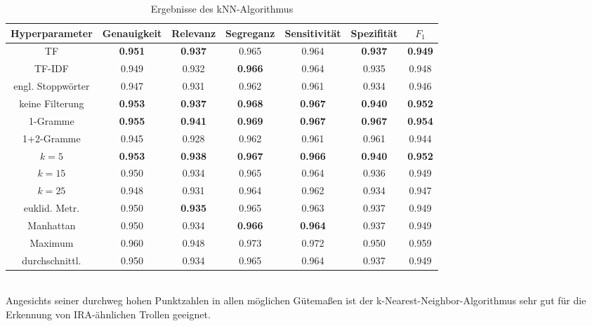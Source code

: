 \begin{table}[htb]
	\begin{center}
		\begin{tabular}{|c|c|c|c|c|c|c|}
			\hline 
			Hyperparameter & Genauigkeit & Relevanz & Segreganz & Sensitivität & Spezifität & $F_1$ \\ \hline \hline
			TF & \textbf{0.951} & \textbf{0.937} & 0.965 & 0.964 & \textbf{0.937} & \textbf{0.949} \\ \hline
			TF-IDF  & 0.949 & 0.932 & \textbf{0.966} & 0.964 & 0.935 & 0.948 \\ \hline \hline
			engl. Stoppwörter  & 0.947 & 0.931 & 0.962 & 0.961 & 0.934 & 0.946 \\ \hline
			keine Filterung  & \textbf{0.953} & \textbf{0.937} & \textbf{0.968} & \textbf{0.967} & \textbf{0.940} & \textbf{0.952} \\ \hline \hline
			1-Gramme  & \textbf{0.955} & \textbf{0.941} & \textbf{0.969} & \textbf{0.967} & \textbf{0.967} & \textbf{0.954} \\ \hline 
			1+2-Gramme  & 0.945 & 0.928 & 0.962 & 0.961 & 0.961 & 0.944 \\ \hline \hline
			$k = 5$  & \textbf{0.953} & \textbf{0.938} & \textbf{0.967} & \textbf{0.966} & \textbf{0.940} & \textbf{0.952} \\ \hline 
			$k = 15$  & 0.950  & 0.934  & 0.965  & 0.964 & 0.936  & 0.949 \\ \hline 
			$k = 25$  & 0.948  & 0.931  & 0.964  & 0.962 & 0.934  & 0.947  \\ \hline \hline
			euklid. Metr.  & 0.950 & \textbf{0.935} & 0.965 & 0.963 & 0.937 & 0.949 \\ \hline
			Manhattan  & 0.950 & 0.934 & \textbf{0.966} &\textbf{0.964} & 0.937 & 0.949 \\ \hline
			\hline
			Maximum  & 0.960 & 0.948 & 0.973 & 0.972 & 0.950 & 0.959 \\ \hline
			durchschnittl. & 0.950 & 0.934 & 0.965 & 0.964 & 0.937 & 0.949 \\ \hline
		\end{tabular}
		\caption{Ergebnisse des kNN-Algorithmus}\label{results-knn}
	\end{center}
\end{table}\\
Angesichts seiner durchweg hohen Punktzahlen in allen möglichen Gütemaßen ist der k-Nearest-Neighbor-Algorithmus sehr gut für die Erkennung von IRA-ähnlichen Trollen geeignet.
